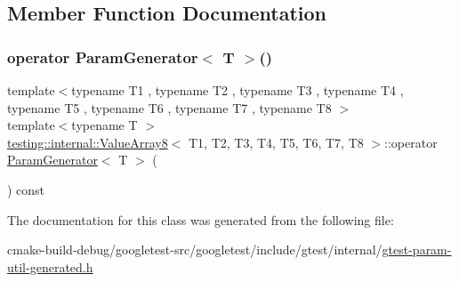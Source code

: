 \subsection{Member Function Documentation}
\mbox{\label{classtesting_1_1internal_1_1ValueArray8_a265f6e8bc6ceede7e673682ddebb82c5}} 
\subsubsection{\texorpdfstring{operator ParamGenerator$<$ T $>$()}{operator ParamGenerator< T >()}}
{\footnotesize\ttfamily template$<$typename T1 , typename T2 , typename T3 , typename T4 , typename T5 , typename T6 , typename T7 , typename T8 $>$ \\
template$<$typename T $>$ \\
\mbox{\hyperlink{classtesting_1_1internal_1_1ValueArray8}{testing\+::internal\+::\+Value\+Array8}}$<$ T1, T2, T3, T4, T5, T6, T7, T8 $>$\+::operator \mbox{\hyperlink{classtesting_1_1internal_1_1ParamGenerator}{Param\+Generator}}$<$ T $>$ (\begin{DoxyParamCaption}{ }\end{DoxyParamCaption}) const\hspace{0.3cm}{\ttfamily [inline]}}



The documentation for this class was generated from the following file\+:\begin{DoxyCompactItemize}
\item 
cmake-\/build-\/debug/googletest-\/src/googletest/include/gtest/internal/\mbox{\hyperlink{gtest-param-util-generated_8h}{gtest-\/param-\/util-\/generated.\+h}}\end{DoxyCompactItemize}
